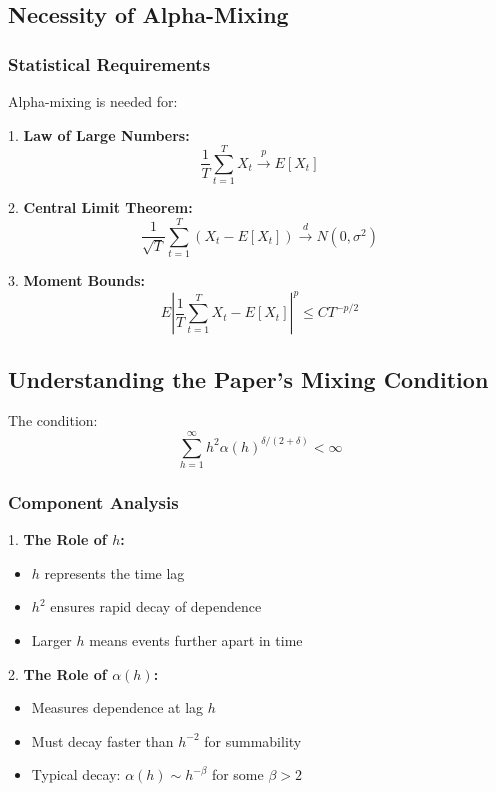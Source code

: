 \documentclass[12pt,article]{memoir}
\begin{document}
\subsection{Necessity of Alpha-Mixing}

\subsubsection{Statistical Requirements}

Alpha-mixing is needed for:

1. \textbf{Law of Large Numbers:}
\begin{equation}
    \frac{1}{T}\sum_{t=1}^T X_t \xrightarrow{p} E[X_t]
\end{equation}

2. \textbf{Central Limit Theorem:}
\begin{equation}
    \frac{1}{\sqrt{T}}\sum_{t=1}^T (X_t - E[X_t]) \xrightarrow{d} N(0, \sigma^2)
\end{equation}

3. \textbf{Moment Bounds:}
\begin{equation}
    E|\frac{1}{T}\sum_{t=1}^T X_t - E[X_t]|^p \leq CT^{-p/2}
\end{equation}

\subsection{Understanding the Paper's Mixing Condition}

The condition:
\begin{equation}
    \sum_{h=1}^{\infty} h^2\alpha(h)^{\delta/(2+\delta)} < \infty
\end{equation}

\subsubsection{Component Analysis}

1. \textbf{The Role of $h$:}
   \begin{itemize}
       \item $h$ represents the time lag
       \item $h^2$ ensures rapid decay of dependence
       \item Larger $h$ means events further apart in time
   \end{itemize}

2. \textbf{The Role of $\alpha(h)$:}
   \begin{itemize}
       \item Measures dependence at lag $h$
       \item Must decay faster than $h^{-2}$ for summability
       \item Typical decay: $\alpha(h) \sim h^{-\beta}$ for some $\beta > 2$
   \end{itemize}
\end{document}
